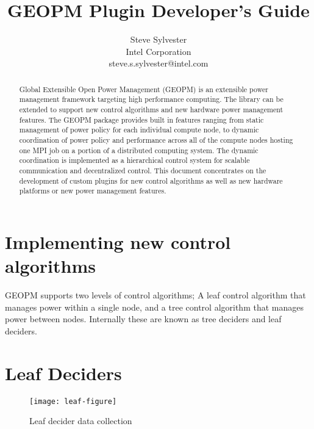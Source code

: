 \documentclass[11pt]{article}
\begin{document}
\sloppy
\title{GEOPM Plugin Developer's Guide}
\author{Steve Sylvester\\
        Intel Corporation\\
        \small{steve.s.sylvester@intel.com}}
\maketitle
\begin{abstract}
Global Extensible Open Power Management (GEOPM) is an extensible
power management framework targeting high performance computing. The
library can be extended to support new control algorithms and new
hardware power management features. The GEOPM package provides built
in features ranging from static management of power policy for each
individual compute node, to dynamic coordination of power policy and
performance across all of the compute nodes hosting one MPI job on a
portion of a distributed computing system. The dynamic coordination is
implemented as a hierarchical control system for scalable
communication and decentralized control. This document concentrates on
the development of custom plugins for new control algorithms as well
as new hardware platforms or new power management features.
\end{abstract}

\section{Implementing new control algorithms}
GEOPM supports two levels of control algorithms; A leaf control
algorithm that manages power within a single node, and a tree control
algorithm that manages power between nodes. Internally these are known
as tree deciders and leaf deciders.

\section{Leaf Deciders}
\begin{figure} [H]
  \centering
  \texttt{[image: leaf-figure]}
  \caption{Leaf decider data collection}
  \label{fig:leaf}
\end{figure}
\end{document}
